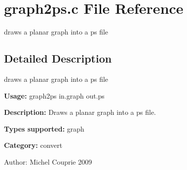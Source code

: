 \section{graph2ps.c File Reference}
\label{graph2ps_8c}
draws a planar graph into a ps file 



\subsection{Detailed Description}
draws a planar graph into a ps file 

{\bf Usage:} graph2ps in.graph out.ps

{\bf Description:} Draws a planar graph into a ps file.

{\bf Types supported:} graph

{\bf Category:} convert

\begin{Desc}
\item[Author:]Michel Couprie 2009 \end{Desc}
